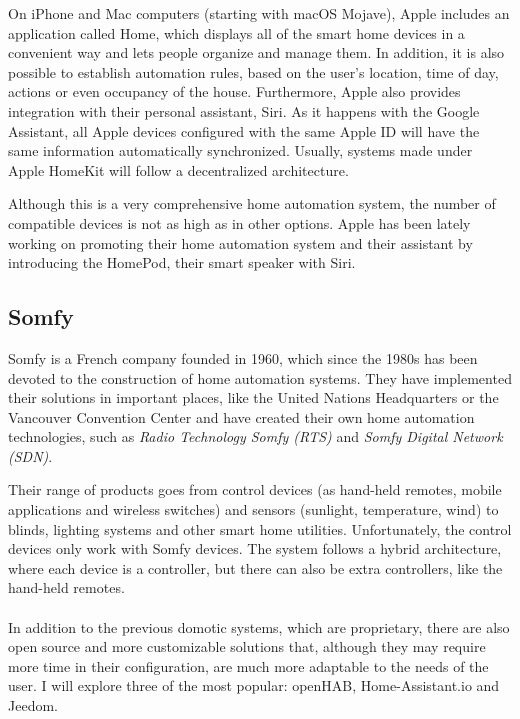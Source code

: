 On iPhone and Mac computers (starting with macOS Mojave), Apple includes an application called Home, which displays all
of the smart home devices in a convenient way and lets people organize and manage them. In addition, it is also possible to establish
automation rules, based on the user's location, time of day, actions or even occupancy of the house. Furthermore, Apple also provides
integration with their personal assistant, Siri. As it happens with the Google Assistant, all Apple devices configured with the same Apple
ID will have the same information automatically synchronized.\cite{appleIOSHome} Usually, systems made under Apple HomeKit will follow
a decentralized architecture.

Although this is a very comprehensive home automation system, the number of compatible devices is not as high as in other options.
Apple has been lately working on promoting their home automation system and their assistant by introducing the HomePod, their smart
speaker with Siri.

\subsection{Somfy}
Somfy is a French company founded in 1960, which since the 1980s has been devoted to the construction of home automation systems.
They have implemented their solutions in important places, like the United Nations Headquarters or the Vancouver Convention Center
and have created their own home automation technologies, such as \textit{Radio Technology Somfy (RTS)} and \textit{Somfy Digital
Network (SDN)}.\cite{somfyOurStory}

Their range of products goes from control devices (as hand-held remotes, mobile applications and wireless switches) and sensors (sunlight,
temperature, wind) to blinds, lighting systems and other smart home utilities. Unfortunately, the control devices only work with Somfy
devices. The system follows a hybrid architecture, where each device is a controller, but there can also be extra controllers, like the
hand-held remotes.
\\~\\

In addition to the previous domotic systems, which are proprietary, there are also open source and more customizable solutions that,
although they may require more time in their configuration, are much more adaptable to the needs of the user. I will explore three of
the most popular: openHAB, Home-Assistant.io and Jeedom.


